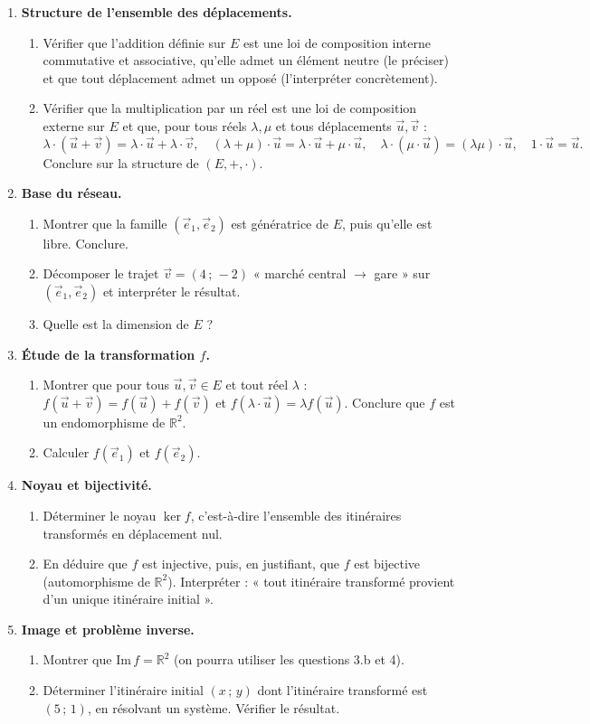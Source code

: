 \documentclass[11pt]{article}
\begin{document}
\begin{enumerate}
\item \textbf{Structure de l'ensemble des déplacements.}
\begin{enumerate}
\item Vérifier que l'addition définie sur $E$ est une loi de composition interne commutative et associative, qu'elle admet un élément neutre (le préciser) et que tout déplacement admet un opposé (l'interpréter concrètement).
\item Vérifier que la multiplication par un réel est une loi de composition externe sur $E$ et que, pour tous réels $\lambda,\mu$ et tous déplacements $\vec{u},\vec{v}$ :
\[
\lambda\cdot(\vec{u}+\vec{v})=\lambda\cdot\vec{u}+\lambda\cdot\vec{v},\quad (\lambda+\mu)\cdot\vec{u}=\lambda\cdot\vec{u}+\mu\cdot\vec{u},\quad \lambda\cdot(\mu\cdot\vec{u})=(\lambda\mu)\cdot\vec{u},\quad 1\cdot\vec{u}=\vec{u}.
\]
Conclure sur la structure de $(E,+,\cdot)$.
\end{enumerate}
\item \textbf{Base du réseau.}
\begin{enumerate}
\item Montrer que la famille $(\vec{e}_1,\vec{e}_2)$ est génératrice de $E$, puis qu'elle est libre. Conclure.
\item Décomposer le trajet $\vec{v}=(4\,;\,-2)$ « marché central $\to$ gare » sur $(\vec{e}_1,\vec{e}_2)$ et interpréter le résultat.
\item Quelle est la dimension de $E$ ?
\end{enumerate}
\item \textbf{Étude de la transformation $f$.}
\begin{enumerate}
\item Montrer que pour tous $\vec{u},\vec{v}\in E$ et tout réel $\lambda$ : $f(\vec{u}+\vec{v})=f(\vec{u})+f(\vec{v})$ et $f(\lambda\cdot\vec{u})=\lambda f(\vec{u})$. Conclure que $f$ est un endomorphisme de $\mathbb{R}^2$.
\item Calculer $f(\vec{e}_1)$ et $f(\vec{e}_2)$.
\end{enumerate}
\item \textbf{Noyau et bijectivité.}
\begin{enumerate}
\item Déterminer le noyau $\ker f$, c'est-à-dire l'ensemble des itinéraires transformés en déplacement nul.
\item En déduire que $f$ est injective, puis, en justifiant, que $f$ est bijective (automorphisme de $\mathbb{R}^2$). Interpréter : « tout itinéraire transformé provient d'un unique itinéraire initial ».
\end{enumerate}
\item \textbf{Image et problème inverse.}
\begin{enumerate}
\item Montrer que $\mathrm{Im}\,f=\mathbb{R}^2$ (on pourra utiliser les questions 3.b et 4).
\item Déterminer l'itinéraire initial $(x\,;\,y)$ dont l'itinéraire transformé est $(5\,;\,1)$, en résolvant un système. Vérifier le résultat.
\end{enumerate}
\end{enumerate}
\end{document}
